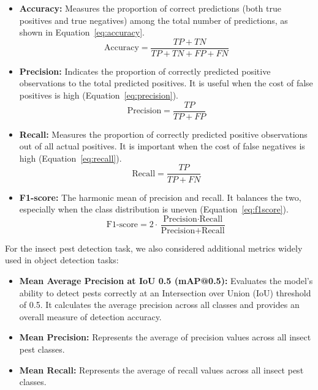 \begin{itemize}
    \item \textbf{Accuracy:} Measures the proportion of correct predictions (both true positives and true negatives) among the total number of predictions, as shown in Equation~\ref{eq:accuracy}.
    \begin{equation}
        \text{Accuracy} = \frac{TP + TN}{TP + TN + FP + FN}
        \label{eq:accuracy}
    \end{equation}

    \item \textbf{Precision:} Indicates the proportion of correctly predicted positive observations to the total predicted positives. It is useful when the cost of false positives is high (Equation~\ref{eq:precision}).
    \begin{equation}
        \text{Precision} = \frac{TP}{TP + FP}
        \label{eq:precision}
    \end{equation}

    \item \textbf{Recall:} Measures the proportion of correctly predicted positive observations out of all actual positives. It is important when the cost of false negatives is high (Equation~\ref{eq:recall}).
    \begin{equation}
        \text{Recall} = \frac{TP}{TP + FN}
        \label{eq:recall}
    \end{equation}

    \item \textbf{F1-score:} The harmonic mean of precision and recall. It balances the two, especially when the class distribution is uneven (Equation~\ref{eq:f1score}).
    \begin{equation}
        \text{F1-score} = 2 \cdot \frac{\text{Precision} \cdot \text{Recall}}{\text{Precision} + \text{Recall}}
        \label{eq:f1score}
    \end{equation}
\end{itemize}

For the insect pest detection task, we also considered additional metrics widely used in object detection tasks:

\begin{itemize}
    \item \textbf{Mean Average Precision at IoU 0.5 (mAP@0.5):} Evaluates the model’s ability to detect pests correctly at an Intersection over Union (IoU) threshold of 0.5. It calculates the average precision across all classes and provides an overall measure of detection accuracy.

    \item \textbf{Mean Precision:} Represents the average of precision values across all insect pest classes.

    \item \textbf{Mean Recall:} Represents the average of recall values across all insect pest classes.
\end{itemize}

